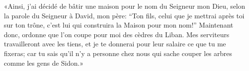 «Ainsi, j’ai décidé de bâtir une maison pour le nom du Seigneur mon Dieu,
	selon la parole du Seigneur à David, mon père:
	“Ton fils, celui que je mettrai après toi sur ton trône,
	c’est lui qui construira la Maison pour mon nom!”
Maintenant donc, ordonne que l’on coupe pour moi des cèdres du Liban.
Mes serviteurs travailleront avec les tiens,
	et je te donnerai pour leur salaire ce que tu me fixeras;
	car tu sais qu’il n’y a personne chez nous
		qui sache couper les arbres comme les gens de Sidon.»

